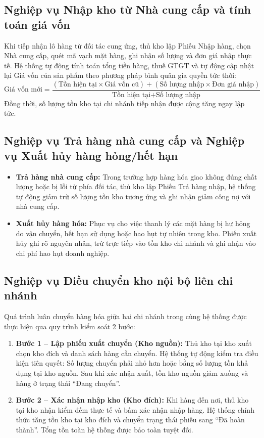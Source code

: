 \documentclass[12pt,a4paper]{report}
\renewcommand{\_}{\textunderscore\allowbreak}
\begin{document}
\subsection{Nghiệp vụ Nhập kho từ Nhà cung cấp và tính toán giá vốn}
Khi tiếp nhận lô hàng từ đối tác cung ứng, thủ kho lập Phiếu Nhập hàng, chọn Nhà cung cấp, quét mã vạch mặt hàng, ghi nhận số lượng và đơn giá nhập thực tế. Hệ thống tự động tính toán tổng tiền hàng, thuế GTGT và tự động cập nhật lại Giá vốn của sản phẩm theo phương pháp bình quân gia quyền tức thời:
\begin{equation}
\text{Giá vốn mới} = \frac{(\text{Tồn hiện tại} \times \text{Giá vốn cũ}) + (\text{Số lượng nhập} \times \text{Đơn giá nhập})}{\text{Tồn hiện tại} + \text{Số lượng nhập}}
\end{equation}
Đồng thời, số lượng tồn kho tại chi nhánh tiếp nhận được cộng tăng ngay lập tức.

\subsection{Nghiệp vụ Trả hàng nhà cung cấp và Nghiệp vụ Xuất hủy hàng hỏng/hết hạn}
\begin{itemize}
    \item \textbf{Trả hàng nhà cung cấp:} Trong trường hợp hàng hóa giao không đúng chất lượng hoặc bị lỗi từ phía đối tác, thủ kho lập Phiếu Trả hàng nhập, hệ thống tự động giảm trừ số lượng tồn kho tương ứng và ghi nhận giảm công nợ với nhà cung cấp.
    \item \textbf{Xuất hủy hàng hóa:} Phục vụ cho việc thanh lý các mặt hàng bị hư hỏng do vận chuyển, hết hạn sử dụng hoặc hao hụt tự nhiên trong kho. Phiếu xuất hủy ghi rõ nguyên nhân, trừ trực tiếp vào tồn kho chi nhánh và ghi nhận vào chi phí hao hụt doanh nghiệp.
\end{itemize}

\subsection{Nghiệp vụ Điều chuyển kho nội bộ liên chi nhánh}
Quá trình luân chuyển hàng hóa giữa hai chi nhánh trong cùng hệ thống được thực hiện qua quy trình kiểm soát 2 bước:
\begin{enumerate}
    \item \textbf{Bước 1 -- Lập phiếu xuất chuyển (Kho nguồn):} Thủ kho tại kho xuất chọn kho đích và danh sách hàng cần chuyển. Hệ thống tự động kiểm tra điều kiện tiên quyết: Số lượng chuyển phải nhỏ hơn hoặc bằng số lượng tồn khả dụng tại kho nguồn. Sau khi xác nhận xuất, tồn kho nguồn giảm xuống và hàng ở trạng thái ``Đang chuyển''.
    \item \textbf{Bước 2 -- Xác nhận nhập kho (Kho đích):} Khi hàng đến nơi, thủ kho tại kho nhận kiểm đếm thực tế và bấm xác nhận nhập hàng. Hệ thống chính thức tăng tồn kho tại kho đích và chuyển trạng thái phiếu sang ``Đã hoàn thành''. Tổng tồn toàn hệ thống được bảo toàn tuyệt đối.
\end{enumerate}
\end{document}
